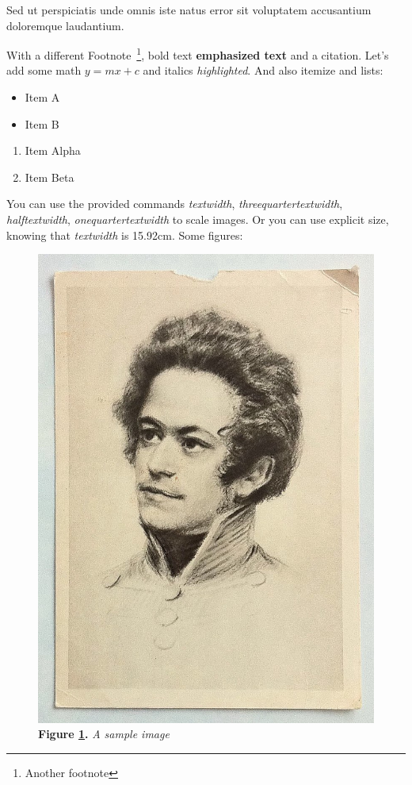 
Sed ut perspiciatis unde omnis iste natus error sit voluptatem accusantium doloremque laudantium.

With a different Footnote~\footnote{Another footnote}, bold text \textbf{emphasized text} and a citation\cite{einstein2013principle}. Let's add some math $y = mx + c$ and italics \textit{highlighted}. And also itemize and lists:
\begin{itemize}
	\item Item A
	\item Item B
\end{itemize}
\begin{enumerate}
	\item Item Alpha
	\item Item Beta
\end{enumerate}

You can use the provided commands \textit{textwidth}, \textit{threequartertextwidth}, \textit{halftextwidth}, \textit{onequartertextwidth} to scale images.
Or you can use explicit size, knowing that \textit{textwidth} is 15.92cm.
Some figures:
\begin{figure}[H]
	\centering
	\includegraphics[width=\onequartertextwidth]{../resources/sample-image.png}
	\caption{\textbf{Figure \ref{fig:sample}.} \textit{A sample image}}
	\label{fig:sample}
\end{figure}

